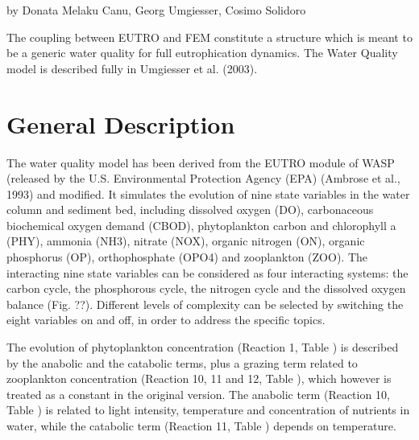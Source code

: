 by Donata Melaku Canu, Georg Umgiesser, Cosimo Solidoro

\vspace{1cm}

The coupling between EUTRO and FEM constitute a structure which 
is meant to be a generic water quality for full eutrophication 
dynamics.
The Water Quality model is described fully in
Umgiesser et al. (2003).



\section{General Description}



The water quality model has been derived from the EUTRO module 
of WASP (released by the U.S. Environmental Protection Agency 
(EPA) (Ambrose et al., 1993) and modified. It simulates the evolution 
of nine state variables in the water column and sediment bed, 
including dissolved oxygen (DO), carbonaceous biochemical oxygen 
demand (CBOD), phytoplankton carbon and chlorophyll a (PHY), 
ammonia (NH3), nitrate (NOX), organic nitrogen (ON), organic 
phosphorus (OP), orthophosphate (OPO4) and zooplankton (ZOO). 
The interacting nine state variables can be considered as four 
interacting systems: the carbon cycle, the phosphorous cycle, 
the nitrogen cycle and the dissolved oxygen balance (Fig. ??). 
Different levels of complexity can be selected by switching the 
eight variables on and off, in order to address the specific 
topics.

The evolution of phytoplankton concentration (Reaction 1, 
Table \Tone)
is described by the anabolic and the catabolic terms, plus 
a grazing term related to zooplankton concentration (Reaction 
10, 11 and 12, Table \Ttwoa), which however is treated as a constant
in the original version. 
The anabolic term (Reaction 10, Table \Ttwoa) is related to light 
intensity, temperature and concentration of nutrients in water, 
while the catabolic term (Reaction 11, Table \Ttwoa) depends on temperature.


